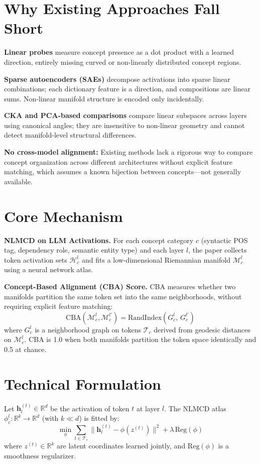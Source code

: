 \documentclass[10pt,twocolumn]{article}
\begin{document}
\section{Why Existing Approaches Fall Short}

\textbf{Linear probes} measure concept presence as a dot product with a learned
direction, entirely missing curved or non-linearly distributed concept regions.

\textbf{Sparse autoencoders (SAEs)} decompose activations into sparse linear
combinations; each dictionary feature is a direction, and compositions are linear
sums. Non-linear manifold structure is encoded only incidentally.

\textbf{CKA and PCA-based comparisons} compare linear subspaces across layers
using canonical angles; they are insensitive to non-linear geometry and cannot
detect manifold-level structural differences.

\textbf{No cross-model alignment:} Existing methods lack a rigorous way to compare
concept organization across different architectures without explicit feature
matching, which assumes a known bijection between concepts---not generally available.

\section{Core Mechanism}

\textbf{NLMCD on LLM Activations.} For each concept category $c$ (syntactic
POS tag, dependency role, semantic entity type) and each layer $l$, the paper
collects token activation sets $\mathcal{H}_c^l$ and fits a low-dimensional
Riemannian manifold $\mathcal{M}_c^l$ using a neural network atlas.

\textbf{Concept-Based Alignment (CBA) Score.} CBA measures whether two manifolds
partition the same token set into the same neighborhoods, without requiring
explicit feature matching:
\[
\text{CBA}(\mathcal{M}_c^l, \mathcal{M}_c^{l'})
= \text{RandIndex}(G_c^l,\, G_c^{l'})
\]
where $G_c^l$ is a neighborhood graph on tokens $\mathcal{T}_c$ derived from
geodesic distances on $\mathcal{M}_c^l$. CBA is 1.0 when both manifolds partition
the token space identically and 0.5 at chance.

\section{Technical Formulation}

Let $\mathbf{h}_l^{(t)} \in \mathbb{R}^d$ be the activation of token $t$ at layer $l$.
The NLMCD atlas $\phi_c^l : \mathbb{R}^k \to \mathbb{R}^d$ (with $k \ll d$) is fitted by:
\[
\min_{\phi} \sum_{t \in \mathcal{T}_c}
  \|\mathbf{h}_l^{(t)} - \phi(z^{(t)})\|^2 + \lambda\,\mathrm{Reg}(\phi)
\]
where $z^{(t)} \in \mathbb{R}^k$ are latent coordinates learned jointly, and
$\mathrm{Reg}(\phi)$ is a smoothness regularizer.
\end{document}
